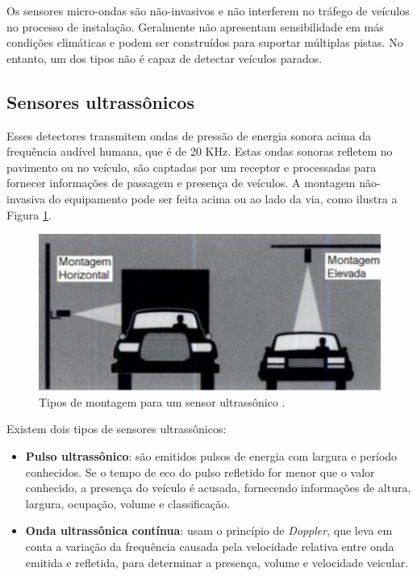 Os sensores micro-ondas são não-invasivos e não interferem no tráfego de veículos no processo de instalação. Geralmente não apresentam sensibilidade em más condições climáticas e podem ser construídos para suportar múltiplas pistas. No entanto, um dos tipos não é capaz de detectar veículos parados.


\subsection{Sensores ultrassônicos} %
\label{sec:sensores_ultrass_nicos}

Esses detectores transmitem ondas de pressão de energia sonora acima da frequência audível humana, que é de 20 KHz. Estas ondas sonoras refletem no pavimento ou no veículo, são captadas por um receptor e processadas para fornecer informações de passagem e presença de veículos. A montagem não-invasiva do equipamento pode ser feita acima ou ao lado da via, como ilustra a Figura \ref{fig:ultrassonico}.

\begin{figure}[ht]
  \begin{center}
    \includegraphics[scale=.65]{imgs/ultrassonico.png}
  \end{center}
  \caption{Tipos de montagem para um sensor ultrassônico \citep{goldner:2009:misc}.}
  \label{fig:ultrassonico}
\end{figure}

Existem dois tipos de sensores ultrassônicos:

\begin{itemize}
  \item \textbf{Pulso ultrassônico}: são emitidos pulsos de energia com largura e período conhecidos. Se o tempo de eco do pulso refletido for menor que o valor conhecido, a presença do veículo é acusada, fornecendo informações de altura, largura, ocupação, volume e classificação.
  \item \textbf{Onda ultrassônica contínua}: usam o princípio  de \textit{Doppler}, que leva em conta a variação da frequência causada pela velocidade relativa entre onda emitida e refletida, para determinar a presença, volume e velocidade veicular.
\end{itemize}

